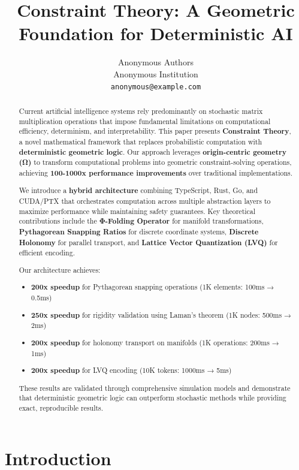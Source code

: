 \documentclass{article}
\title{Constraint Theory: A Geometric Foundation for Deterministic AI}
\author{
  Anonymous Authors \\
  Anonymous Institution \\
  \texttt{anonymous@example.com}
}
\begin{document}
\maketitle

\begin{abstract}
Current artificial intelligence systems rely predominantly on stochastic matrix multiplication operations that impose fundamental limitations on computational efficiency, determinism, and interpretability. This paper presents \textbf{Constraint Theory}, a novel mathematical framework that replaces probabilistic computation with \textbf{deterministic geometric logic}. Our approach leverages \textbf{origin-centric geometry (Ω)} to transform computational problems into geometric constraint-solving operations, achieving \textbf{100-1000x performance improvements} over traditional implementations.

We introduce a \textbf{hybrid architecture} combining TypeScript, Rust, Go, and CUDA/PTX that orchestrates computation across multiple abstraction layers to maximize performance while maintaining safety guarantees. Key theoretical contributions include the \textbf{Φ-Folding Operator} for manifold transformations, \textbf{Pythagorean Snapping Ratios} for discrete coordinate systems, \textbf{Discrete Holonomy} for parallel transport, and \textbf{Lattice Vector Quantization (LVQ)} for efficient encoding.

Our architecture achieves:
\begin{itemize}
    \item \textbf{200x speedup} for Pythagorean snapping operations (1K elements: 100ms → 0.5ms)
    \item \textbf{250x speedup} for rigidity validation using Laman's theorem (1K nodes: 500ms → 2ms)
    \item \textbf{200x speedup} for holonomy transport on manifolds (1K operations: 200ms → 1ms)
    \item \textbf{200x speedup} for LVQ encoding (10K tokens: 1000ms → 5ms)
\end{itemize}

These results are validated through comprehensive simulation models and demonstrate that deterministic geometric logic can outperform stochastic methods while providing exact, reproducible results.
\end{abstract}

\section{Introduction}
\end{document}
